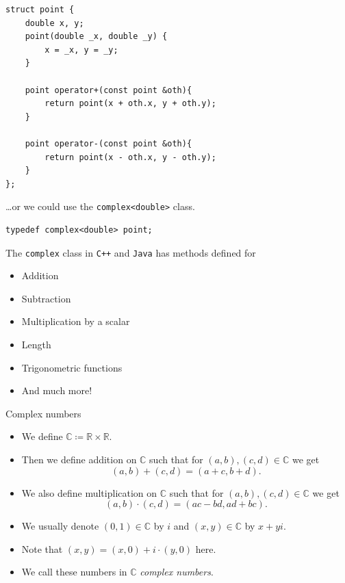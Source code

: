 \documentclass{beamer}
\begin{document}
\begin{frame}
  \begin{verbatim}
struct point {
    double x, y;
    point(double _x, double _y) { 
        x = _x, y = _y;
    }

    point operator+(const point &oth){
        return point(x + oth.x, y + oth.y);
    }

    point operator-(const point &oth){
        return point(x - oth.x, y - oth.y);
    }
};
  \end{verbatim}
\end{frame}

\begin{frame}
  \vspace{20pt}
  \ldots or we could use the \texttt{complex<double>} class. 
  \begin{verbatim}
typedef complex<double> point;
  \end{verbatim}
  \vspace{10pt}
  The \texttt{complex} class in \texttt{C++} and \texttt{Java} has methods defined for
  \begin{itemize}
    \item Addition
    \item Subtraction
    \item Multiplication by a scalar
    \item Length
    \item Trigonometric functions
    \item And much more!
  \end{itemize}
\end{frame}

\begin{frame}[plain]{Complex numbers}
	\begin{itemize}
        \item We define $\mathbb{C} \coloneqq \mathbb{R} \times \mathbb{R}$.
        \item Then we define addition on $\mathbb{C}$ such that for $(a, b), (c, d) \in \mathbb{C}$ we get
			\[
				(a, b) + (c, d) = (a + c, b + d).
			\]
        \item We also define multiplication on $\mathbb{C}$ such that for $(a, b), (c, d) \in \mathbb{C}$ we get
			\[
				(a, b) \cdot (c, d) = (ac - bd, ad + bc).
			\]
        \item We usually denote $(0, 1) \in \mathbb{C}$ by $i$ and $(x, y) \in \mathbb{C}$ by $x + yi$.
        \item Note that $(x, y) = (x, 0) + i \cdot (y, 0)$ here.
        \item We call these numbers in $\mathbb{C}$ \emph{complex numbers}.
    \end{itemize}
\end{frame}
\end{document}
